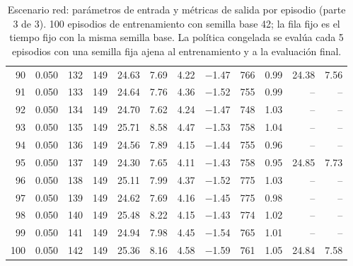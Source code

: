 \begin{table}[H]
\begin{tabular}{rrrrrrrrrrrr}
90 & 0.050 & 132 & 149 & 24.63 & 7.69 & 4.22 & $-$1.47 & 766 & 0.99 & 24.38 & 7.56 \\
91 & 0.050 & 133 & 149 & 24.64 & 7.76 & 4.36 & $-$1.52 & 755 & 0.99 & -- & -- \\
92 & 0.050 & 134 & 149 & 24.70 & 7.62 & 4.24 & $-$1.47 & 748 & 1.03 & -- & -- \\
93 & 0.050 & 135 & 149 & 25.71 & 8.58 & 4.47 & $-$1.53 & 758 & 1.04 & -- & -- \\
94 & 0.050 & 136 & 149 & 24.56 & 7.89 & 4.15 & $-$1.44 & 755 & 0.96 & -- & -- \\
95 & 0.050 & 137 & 149 & 24.30 & 7.65 & 4.11 & $-$1.43 & 758 & 0.95 & 24.85 & 7.73 \\
96 & 0.050 & 138 & 149 & 25.11 & 7.99 & 4.37 & $-$1.52 & 775 & 1.03 & -- & -- \\
97 & 0.050 & 139 & 149 & 24.62 & 7.69 & 4.16 & $-$1.45 & 775 & 0.98 & -- & -- \\
98 & 0.050 & 140 & 149 & 25.48 & 8.22 & 4.15 & $-$1.43 & 774 & 1.02 & -- & -- \\
99 & 0.050 & 141 & 149 & 24.94 & 7.98 & 4.45 & $-$1.54 & 765 & 1.01 & -- & -- \\
100 & 0.050 & 142 & 149 & 25.36 & 8.16 & 4.58 & $-$1.59 & 761 & 1.05 & 24.84 & 7.58 \\
\bottomrule
\end{tabular}
\caption[Escenario red: episodios de entrenamiento (parte 3 de 3)]{Escenario red: parámetros de entrada y métricas de salida por episodio (parte 3 de 3). 100 episodios de entrenamiento con semilla base 42; la fila fijo es el tiempo fijo con la misma semilla base. La política congelada se evalúa cada 5 episodios con una semilla fija ajena al entrenamiento y a la evaluación final.}
\label{tab:red-episodios-3}
\end{table}

